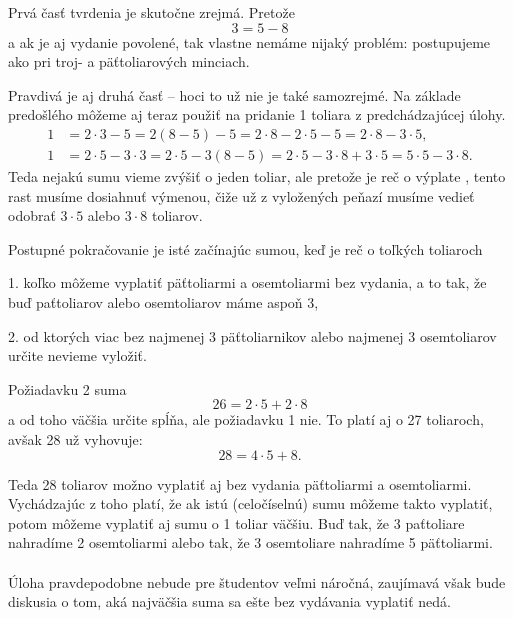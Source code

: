 {{Prvá časť tvrdenia je skutočne zrejmá. Pretože $$3=5-8$$ a ak je aj vydanie povolené, tak vlastne nemáme nijaký problém: postupujeme ako pri troj- a päťtoliarových minciach. 

Pravdivá je aj druhá časť -- hoci to už nie je také samozrejmé. Na základe predošlého môžeme aj teraz použiť na pridanie 1 toliara  z predchádzajúcej úlohy. 
\begin{align*}
1 & = 2\cdot 3- 5 = 2 (8-5) - 5 = 2\cdot  8 - 2\cdot 5 - 5 = 2\cdot 8 - 3\cdot 5,\\
1 & = 2\cdot 5 - 3\cdot 3=2\cdot 5 -3  (8-5) =2\cdot 5 - 3\cdot 8 + 3 \cdot 5 = 5\cdot 5 - 3 \cdot 8.
\end{align*}
Teda nejakú sumu vieme zvýšiť o jeden toliar, ale pretože je reč o výplate , tento rast musíme dosiahnuť výmenou, čiže už z vyložených peňazí musíme vedieť odobrať $3\cdot 5$ alebo $3\cdot 8$ toliarov.

Postupné pokračovanie je isté začínajúc sumou, keď je reč o toľkých toliaroch

1. koľko môžeme vyplatiť päťtoliarmi a osemtoliarmi bez vydania, a to tak, že buď paťtoliarov alebo osemtoliarov máme aspoň 3,

2. od ktorých viac bez najmenej 3 päťtoliarnikov alebo najmenej 3 osemtoliarov určite nevieme vyložiť. 

Požiadavku 2 suma $$26=2\cdot 5 + 2\cdot 8$$ a od toho väčšia určite spĺňa, ale požiadavku 1 nie. To platí aj o 27 toliaroch, avšak 28 už vyhovuje:
$$28=4\cdot 5 + 8.$$

Teda 28 toliarov možno vyplatiť aj bez vydania päťtoliarmi a osemtoliarmi. Vychádzajúc z toho platí, že ak istú (celočíselnú) sumu môžeme takto vyplatiť, potom môžeme vyplatiť aj sumu o 1 toliar väčšiu. Buď tak, že 3 paťtoliare nahradíme 2 osemtoliarmi alebo tak, že 3 osemtoliare nahradíme 5 päťtoliarmi.\\
\\
\kom Úloha pravdepodobne nebude pre študentov veľmi náročná, zaujímavá však bude diskusia o tom, aká najväčšia suma sa ešte bez vydávania vyplatiť nedá.\\
\\}

}
